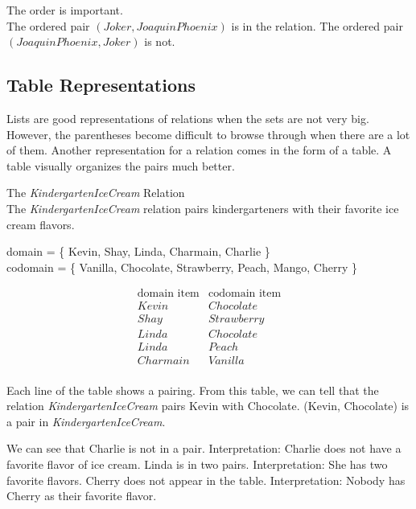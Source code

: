 \documentclass{ximera}
\begin{document}
The order is important. \\

The ordered pair $(Joker, Joaquin Phoenix)$ is in the relation.  The ordered pair $(Joaquin Phoenix, Joker)$ is not. \\













\subsection*{Table Representations}



Lists are good representations of relations when the sets are not very big. However, the parentheses become difficult to browse through when there are a lot of them. Another representation for a relation comes in the form of a table. A table visually organizes the pairs much better.

\begin{example} The \textit{KindergartenIceCream} Relation\\
The \textit{KindergartenIceCream} relation pairs kindergarteners with their favorite ice cream flavors.

domain = \{ Kevin, Shay, Linda, Charmain, Charlie \}  \\
codomain = \{ Vanilla, Chocolate, Strawberry, Peach, Mango, Cherry \} 

\[
\begin{array}{l|l}
    \text{domain item}      & \text{codomain item}      \\ \hline
    Kevin   &  Chocolate \\
    Shay   & Strawberry \\
    Linda  &  Chocolate \\
    Linda  &  Peach \\
    Charmain &  Vanilla \\ 
\end{array}
\]


Each line of the table shows a pairing. From this table, we can tell that the relation \textit{KindergartenIceCream} pairs Kevin with Chocolate.  (Kevin, Chocolate) is a pair in \textit{KindergartenIceCream}.

We can see that Charlie is not in a pair.  Interpretation: Charlie does not have a favorite flavor of ice cream. Linda is in two pairs.  Interpretation: She has two favorite flavors.  Cherry does not appear in the table. Interpretation: Nobody has Cherry as their favorite flavor.

\end{example} 
\end{document}
